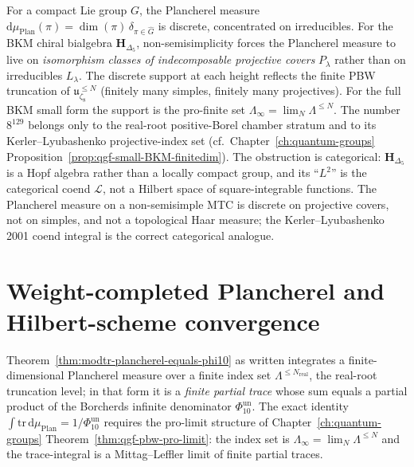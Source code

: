 \begin{remark}
\label{rem:modtr-plan-vs-haar}
For a compact Lie group $G$, the Plancherel measure $\mathrm d\mu_{\mathrm
{Plan}}(\pi) = \dim(\pi)\,\delta_{\pi\in\widehat G}$ is discrete,
concentrated on irreducibles. For the BKM chiral bialgebra
$\mathbf H_{\Delta_5}$, non-semisimplicity forces the Plancherel measure
to live on \emph{isomorphism classes of indecomposable projective
covers} $P_\lambda$ rather than on irreducibles $L_\lambda$. The
discrete support at each height reflects the finite PBW truncation of
$\mathfrak u_{\zeta_8}^{\leq N}$ (finitely many simples, finitely many
projectives).  For the full BKM small form the support is the
pro-finite set \(\Lambda_\infty=\lim_N\Lambda^{\leq N}\).  The number
\(8^{129}\) belongs only to the real-root positive-Borel chamber
stratum and to its Kerler--Lyubashenko projective-index set
(cf.\ Chapter~\ref{ch:quantum-groups}
Proposition~\ref{prop:qgf-small-BKM-finitedim}).
The obstruction is categorical: \(\mathbf H_{\Delta_5}\) is a Hopf
algebra rather than a locally compact group, and its ``$L^2$'' is the
categorical coend
$\mathcal L$, not a Hilbert space of square-integrable functions.
The Plancherel measure on a non-semisimple MTC is discrete on
projective covers, not on simples, and not a topological Haar
measure; the Kerler--Lyubashenko 2001 coend integral is the correct
categorical analogue.
\end{remark}

\section{Weight-completed Plancherel and Hilbert-scheme convergence}
\label{sec:modtr-weight-completion-hs-convergence}

Theorem~\ref{thm:modtr-plancherel-equals-phi10} as written
integrates a finite-dimensional Plancherel measure over a
finite index set $\Lambda^{\leq N_{\mathrm{real}}}$, the real-root
truncation level; in that form it is a
\emph{finite partial trace} whose sum equals a partial product of the
Borcherds infinite denominator $\Phi_{10}^{\mathrm{un}}$. The exact identity
$\int\mathrm{tr}\,\mathrm d\mu_{\mathrm{Plan}} = 1/\Phi_{10}^{\mathrm{un}}$ requires
the pro-limit structure of
Chapter~\ref{ch:quantum-groups}
Theorem~\ref{thm:qgf-pbw-pro-limit}: the index set is
$\Lambda_\infty = \lim_N\Lambda^{\leq N}$ and the trace-integral is
a Mittag--Leffler limit of finite partial traces.

